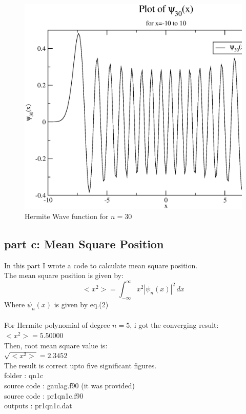 \documentclass[11pt,a4paper,english]{article}
\newcommand{\beq}{\begin{equation}}
\newcommand{\eeq}{\end{equation}}
\begin{document}
	\begin{figure}[h!]
	\centering
	\includegraphics [scale=0.6]{pr1qn1b.eps}
	\caption{Hermite Wave function for $n=30$ }
	\end{figure}
	\clearpage
	

	
	\subsection{part c: Mean Square Position}
In this part I wrote a code to calculate mean square position.\\
The mean square position is given by:\\
\beq
<x^{2}> = \int_{-\infty}^{\infty} \!\! x^{2} |\psi_{n}(x)|^{2}  \,dx 
\eeq
Where $\psi_{n}(x)$ is given by eq.(2)\\\\
For Hermite polynomial of degree $n=5$, i got the converging result:\\
$<x^{2}> = 5.50000 $\\
Then, root mean square value is:\\
$\sqrt{<x^{2}>}= 2.3452 $\\
The result is correct upto five significant figures.\\

    folder       : qn1c\\
	source code  : gaulag.f90 (it was provided)\\
	source code  : pr1qn1c.f90\\
	outputs      : pr1qn1c.dat\\
\end{document}
